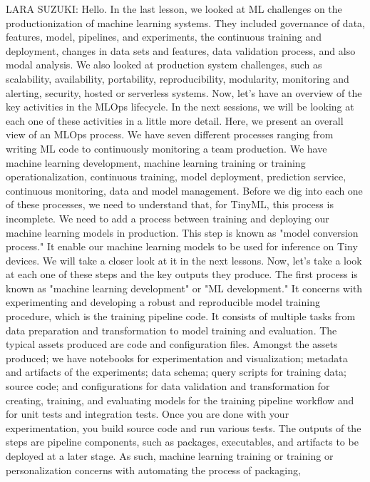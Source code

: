 LARA SUZUKI: Hello.
In the last lesson, we looked at ML challenges
on the productionization of machine learning systems.
They included governance of data, features, model, pipelines,
and experiments, the continuous training and deployment, changes
in data sets and features, data validation process,
and also modal analysis.
We also looked at production system challenges,
such as scalability, availability, portability, reproducibility,
modularity, monitoring and alerting, security, hosted or serverless systems.
Now, let's have an overview of the key activities in the MLOps lifecycle.
In the next sessions, we will be looking at each one of these activities
in a little more detail.
Here, we present an overall view of an MLOps process.
We have seven different processes ranging
from writing ML code to continuously monitoring a team production.
We have machine learning development, machine learning training or training
operationalization, continuous training, model deployment, prediction service,
continuous monitoring, data and model management.
Before we dig into each one of these processes,
we need to understand that, for TinyML, this process is incomplete.
We need to add a process between training and deploying our machine
learning models in production.
This step is known as "model conversion process."
It enable our machine learning models to be used for inference on Tiny devices.
We will take a closer look at it in the next lessons.
Now, let's take a look at each one of these steps
and the key outputs they produce.
The first process is known as "machine learning development"
or "ML development."
It concerns with experimenting and developing
a robust and reproducible model training procedure, which
is the training pipeline code.
It consists of multiple tasks from data preparation and transformation
to model training and evaluation.
The typical assets produced are code and configuration files.
Amongst the assets produced; we have notebooks for experimentation
and visualization; metadata and artifacts of the experiments;
data schema; query scripts for training data;
source code; and configurations for data validation and transformation
for creating, training, and evaluating models
for the training pipeline workflow and for unit tests and integration tests.
Once you are done with your experimentation, you build source code
and run various tests.
The outputs of the steps are pipeline components,
such as packages, executables, and artifacts
to be deployed at a later stage.
As such, machine learning training or training or personalization
concerns with automating the process of packaging,

